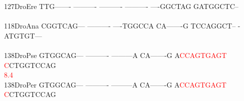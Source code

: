 \documentclass[11pt,twoside,reqno,a4paper]{article}
\begin{document}
{127\hspace*{1\charwidth}DroEre	TTG-------	----------	----------	----------	----GGCTAG	GATGGCTC--	\\
\hspace*{4\charwidth}\hspace*{7\charwidth}\hspace*{1\charwidth}\hspace*{1\charwidth}\hspace*{1\charwidth}\hspace*{1\charwidth}\hspace*{1\charwidth}\hspace*{1\charwidth}\\
118\hspace*{1\charwidth}DroAna	CGGTCAG---	----------	----TGGCCA	CA-------G	TCCAGGCT--	-ATGTGT---	\\
\hspace*{4\charwidth}\hspace*{7\charwidth}\hspace*{1\charwidth}\hspace*{1\charwidth}\hspace*{1\charwidth}\hspace*{1\charwidth}\hspace*{1\charwidth}\hspace*{1\charwidth}\\
138\hspace*{1\charwidth}DroPse	GTGGCAG---	----------	---------A	CA-------G	A\textcolor{Red}{C}\textcolor{Red}{C}\textcolor{Red}{A}\textcolor{Red}{G}\textcolor{Red}{T}\textcolor{Red}{G}\textcolor{Red}{A}\textcolor{Red}{G}\textcolor{Red}{T}	\textcolor{Red}{C}CTGGTCCAG	\\
\hspace*{4\charwidth}\hspace*{7\charwidth}\hspace*{1\charwidth}\hspace*{1\charwidth}\hspace*{1\charwidth}\hspace*{1\charwidth}\hspace*{41\charwidth}\textcolor{Red}{8.4}\hspace*{1\charwidth}\hspace*{1\charwidth}\\
138\hspace*{1\charwidth}DroPer	GTGGCAG---	----------	---------A	CA-------G	A\textcolor{Red}{C}\textcolor{Red}{C}\textcolor{Red}{A}\textcolor{Red}{G}\textcolor{Red}{T}\textcolor{Red}{G}\textcolor{Red}{A}\textcolor{Red}{G}\textcolor{Red}{T}	\textcolor{Red}{C}CTGGTCCAG	\\
}
\end{document}
